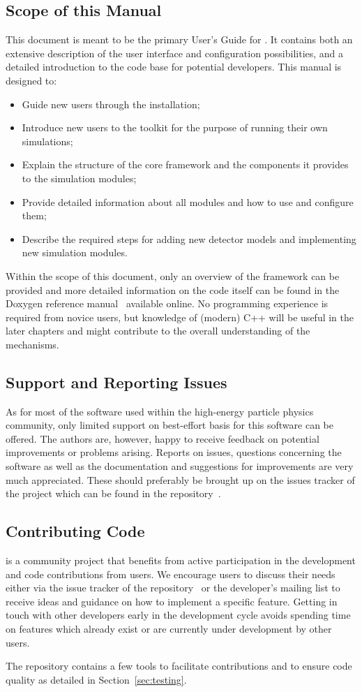 \subsection{Scope of this Manual}
This document is meant to be the primary User's Guide for \apsq.
It contains both an extensive description of the user interface and configuration possibilities, and a detailed introduction to the code base for potential developers.
This manual is designed to:
\begin{itemize}
\item Guide new users through the installation;
\item Introduce new users to the toolkit for the purpose of running their own simulations;
\item Explain the structure of the core framework and the components it provides to the simulation modules;
\item Provide detailed information about all modules and how to use and configure them;
\item Describe the required steps for adding new detector models and implementing new simulation modules.
\end{itemize}

Within the scope of this document, only an overview of the framework can be provided and more detailed information on the code itself can be found in the Doxygen reference manual~\cite{ap2-doxygen} available online.
No programming experience is required from novice users, but knowledge of (modern) C++ will be useful in the later chapters and might contribute to the overall understanding of the mechanisms.

\subsection{Support and Reporting Issues}
As for most of the software used within the high-energy particle physics community, only limited support on best-effort basis for this software can be offered.
The authors are, however, happy to receive feedback on potential improvements or problems arising.
Reports on issues, questions concerning the software as well as the documentation and suggestions for improvements are very much appreciated.
These should preferably be brought up on the issues tracker of the project which can be found in the repository~\cite{ap2-issue-tracker}.


\subsection{Contributing Code}
\apsq is a community project that benefits from active participation in the development and code contributions from users.
We encourage users to discuss their needs either via the issue tracker of the repository~\cite{ap2-issue-tracker} or the developer's mailing list to receive ideas and guidance on how to implement a specific feature.
Getting in touch with other developers early in the development cycle avoids spending time on features which already exist or are currently under development by other users.

The repository contains a few tools to facilitate contributions and to ensure code quality as detailed in Section~\ref{sec:testing}.
